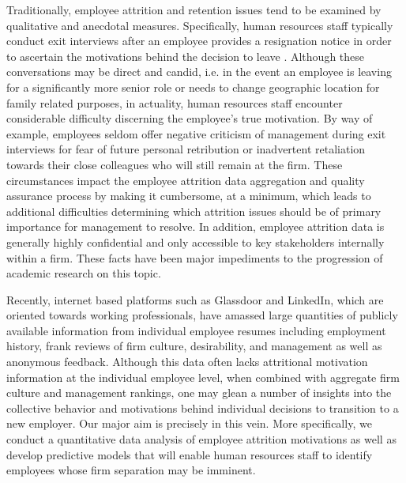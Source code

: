 \documentclass[10pt]{article}
\begin{document}
Traditionally, employee attrition and retention issues tend to be examined by qualitative and anecdotal 
measures.  Specifically, human resources staff typically conduct exit interviews after an employee provides 
a resignation notice in order to ascertain the motivations behind the decision to leave \cite{Giac1991}.  Although 
these conversations may be direct and candid, i.e. in the event an employee is leaving for a significantly 
more senior role or needs to change geographic location for family related purposes, in actuality, human resources staff
encounter considerable difficulty discerning the employee's true motivation.  By way of example, employees 
seldom offer negative criticism of management during exit interviews for fear of future personal retribution 
or inadvertent retaliation towards their close colleagues who will still remain at the firm.
These circumstances impact the employee attrition data aggregation and quality assurance process 
by making it cumbersome, at a minimum, which leads to additional difficulties determining which 
attrition issues should be of primary importance for management to resolve. In addition, employee 
attrition data is generally highly confidential and only accessible to key stakeholders internally 
within a firm.  These facts have been major impediments to the progression of academic research on 
this topic. 

Recently, internet based platforms such as Glassdoor and LinkedIn, which are oriented towards working 
professionals, have amassed large quantities of publicly available information from individual 
employee resumes including employment history, frank reviews of firm culture, desirability, and management
as well as anonymous feedback.  Although this data often lacks attritional motivation information at 
the individual employee level, when combined with aggregate firm culture and management rankings, 
one may glean a number of insights into the collective behavior and motivations behind individual 
decisions to transition to a new employer. Our major aim is precisely in this vein.  More specifically, 
we conduct a quantitative data analysis of employee attrition motivations as well as develop 
predictive models that will enable human resources staff to identify employees whose firm separation 
may be imminent.
\end{document}
